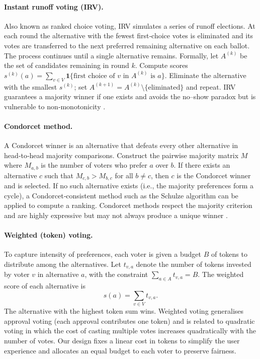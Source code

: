 \paragraph{Instant runoff voting (IRV).}  Also known as ranked
choice voting, IRV simulates a series of runoff elections.  At each
round the alternative with the fewest first‑choice votes is eliminated
and its votes are transferred to the next preferred remaining
alternative on each ballot.  The process continues until a single
alternative remains.  Formally, let $A^{(k)}$ be the set of
candidates remaining in round $k$.  Compute scores
\(s^{(k)}(a) = \sum_{v \in V} \mathbf{1}\{\text{first choice of }v\text{ in }A^{(k)}\text{ is }a\}\).  Eliminate the alternative with the smallest
$s^{(k)}$; set $A^{(k+1)} = A^{(k)} \setminus \{\text{eliminated}\}$ and repeat.  IRV guarantees a majority winner if one exists and avoids
the no–show paradox but is vulnerable to non‑monotonicity
\cite{Bartholdi1989}.

\paragraph{Condorcet method.}  A Condorcet winner is an alternative
that defeats every other alternative in head‑to‑head majority
comparisons.  Construct the pairwise majority matrix $M$ where
$M_{a,b}$ is the number of voters who prefer $a$ over $b$.
If there exists an alternative $c$ such that $M_{c,b} > M_{b,c}$
for all $b \neq c$, then $c$ is the Condorcet winner and is
selected.  If no such alternative exists (i.e., the majority
preferences form a cycle), a Condorcet‑consistent method such as the
Schulze algorithm can be applied to compute a ranking.  Condorcet
methods respect the majority criterion and are highly expressive but
may not always produce a unique winner \cite{Condorcet1785}.

\paragraph{Weighted (token) voting.}  To capture intensity of
preferences, each voter is given a budget $B$ of tokens to distribute
among the alternatives.  Let $t_{v,a}$ denote the number of tokens
invested by voter $v$ in alternative $a$, with the constraint
$\sum_{a \in A} t_{v,a} = B$.  The weighted score of each
alternative is
\begin{equation}
    s(a) = \sum_{v \in V} t_{v,a}.
\end{equation}
The alternative with the highest token sum wins.  Weighted voting
generalises approval voting (each approval contributes one token) and
is related to quadratic voting in which the cost of casting multiple
votes increases quadratically with the number of votes.  Our design
fixes a linear cost in tokens to simplify the user experience and
allocates an equal budget to each voter to preserve fairness.

